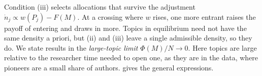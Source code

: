 Condition (iii) selects allocations that survive the adjustment
$\dot n_j\propto w(P_j)-F(M)$. At a crossing where $w$ rises, one more entrant
raises the payoff of entering and draws in more. Topics in equilibrium need
not have the same density a priori, but (ii) and (iii) leave a single
admissible density, so they do. We state results in the \emph{large-topic
limit} $\Phi(M)/N\to 0$. Here topics are large relative to the researcher time
needed to open one, as they are in the data, where pioneers are a small share
of authors.  gives the general expressions.
